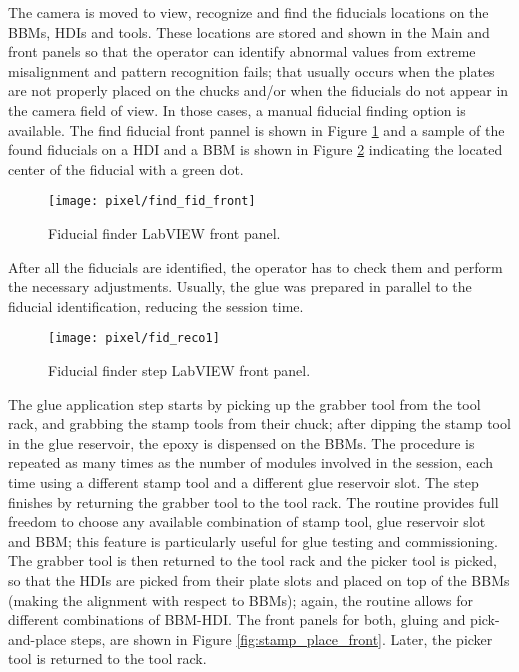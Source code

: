 The camera is moved to view, recognize and find the fiducials locations on the BBMs, HDIs and tools. These locations are stored and shown in the Main and  front panels so that the operator can identify abnormal values from extreme misalignment and pattern recognition fails; that usually occurs when the plates are not properly placed on the chucks and/or when the fiducials do not appear in the camera field of view. In those cases, a manual fiducial finding option is available. The find fiducial front pannel is shown in Figure \ref{fig:find_fid_front} and a sample of the found fiducials on a HDI and a BBM is shown in Figure \ref{fig:fid_reco} indicating the located center of the fiducial with a green dot. 

\begin{landscape}
\begin{figure}[h]
\centering
    \vspace{-2.0cm}
    \hspace{-1cm}
    \texttt{[image: pixel/find\_fid\_front]}
    \caption[Fiducial finder LabVIEW front panel]{Fiducial finder LabVIEW front panel.}\label{fig:find_fid_front}
    \vspace{-1cm}
    \hspace{-2cm}
\end{figure}
\end{landscape}

After all the fiducials are identified, the operator has to check them and perform the necessary adjustments. Usually, the glue was prepared in parallel to the fiducial identification, reducing the session time.

\begin{figure}[h]
\centering
  \texttt{[image: pixel/fid\_reco1]}
 \caption[Fiducial finder step LabVIEW front panel]{Fiducial finder step LabVIEW front panel.}\label{fig:fid_reco}
\end{figure}

The glue application step starts by picking up the grabber tool from the tool rack, and grabbing the stamp tools from their chuck; after dipping the stamp tool in the glue reservoir, the epoxy is dispensed on the BBMs. The procedure is repeated as many times as the number of modules involved in the session, each time using a different stamp tool and a different glue reservoir slot. The step finishes by returning the grabber tool to the tool rack. The routine provides full freedom to choose any available combination of stamp tool, glue reservoir slot and BBM; this feature is particularly useful for glue testing and commissioning. The grabber tool is then returned to the tool rack and the picker tool is picked, so that the HDIs are picked from their plate slots and placed on top of the BBMs (making the alignment with respect to BBMs); again, the routine allows for different combinations of BBM-HDI. The front panels for both, gluing and pick-and-place steps, are shown in Figure \ref{fig:stamp_place_front}. Later, the picker tool is returned to the tool rack.

